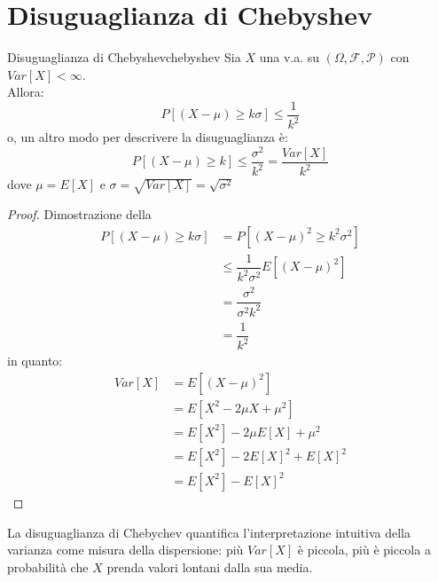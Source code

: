 \documentclass[12pt]{report}
\newcounter{theorem}
\newcommand{\namerefl}[1]{%
	\bgroup
	\let\nmu\MakeLowercase
	\nameref{#1}\egroup}
\newcommand{\nmu}{}
\begin{document}
	 \section{Disuguaglianza di Chebyshev}
	 \begin{theorem}{\nmu Disuguaglianza di Chebyshev}{chebyshev}
	 	Sia $X$ una v.a. su $(\Omega, \mathcal{F}, \mathcal{P})$ con $Var[X] < \infty$. \\
	 	Allora:
	 	\[
	 	P[(X - \mu) \geq k\sigma] \leq \dfrac{1}{k^2}
	 	\]
	 	o, un altro modo per descrivere la disuguaglianza è:
	 	\[
	 	P[(X -\mu) \geq k] \leq \dfrac{\sigma^2}{k^2} = \dfrac{Var[X]}{k^2}
	 	\]
	 	dove $\mu = E[X]$ e $\sigma = \sqrt{Var[X]} = \sqrt{\sigma^2}$
	 \end{theorem}
	 \begin{proof}{Dimostrazione della \namerefl{th:chebyshev}}\quad \\
	 	\begin{align*}
	 		P[(X - \mu) \geq k\sigma] &= P[(X - \mu)^2 \geq k^2\sigma^2] \\
	 		&\leq \dfrac{1}{k^2\sigma^2}E[(X - \mu)^2] \\
	 		&= \dfrac{\sigma^2}{\sigma^2k^2} \\
	 		&= \dfrac{1}{k^2}
	 	\end{align*}
	 	in quanto:
	 	\begin{align*}
	 	Var[X] &= E[(X - \mu)^2] \\
	 	&= E[X^2 - 2\mu X + \mu^2] \\
	 	&= E[X^2] - 2\mu E[X] + \mu^2 \\
	 	&= E[X^2] - 2E[X]^2 + E[X]^2 \\
	 	&= E[X^2] - E[X]^2
	 	\end{align*}
	 \end{proof}
	 La disuguaglianza di Chebychev quantifica l'interpretazione intuitiva della varianza come misura della dispersione: più $Var[X]$ è piccola, più è piccola a probabilità che $X$ prenda valori lontani dalla sua media.
\end{document}
